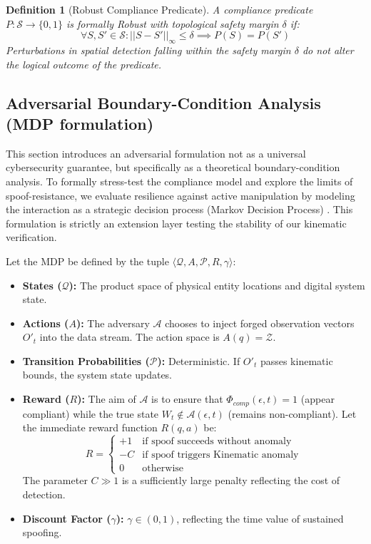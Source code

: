 \documentclass[conference]{IEEEtran}
\newtheorem{definition}{Definition}
\newcommand{\Z}{\mathcal{Z}} %
\newcommand{\Sstate}{\mathcal{S}} %
\newcommand{\Auth}{\mathcal{A}} %
\begin{document}
\begin{definition}[Robust Compliance Predicate]
A compliance predicate $P: \Sstate \to \{0, 1\}$ is formally Robust with topological safety margin $\delta$ if:
\begin{equation}
\forall S, S' \in \Sstate: ||S - S'||_\infty \le \delta \implies P(S) = P(S')
\end{equation}
Perturbations in spatial detection falling within the safety margin $\delta$ do not alter the logical outcome of the predicate.
\end{definition}

\subsection{Adversarial Boundary-Condition Analysis (MDP formulation)}

This section introduces an adversarial formulation not as a universal cybersecurity guarantee, but specifically as a theoretical boundary-condition analysis. To formally stress-test the compliance model and explore the limits of spoof-resistance, we evaluate resilience against active manipulation by modeling the interaction as a strategic decision process (Markov Decision Process) \cite{b10, b21}. This formulation is strictly an extension layer testing the stability of our kinematic verification.

Let the MDP be defined by the tuple $\langle \mathcal{Q}, A, \mathcal{P}, R, \gamma \rangle$:
\begin{itemize}
    \item \textbf{States ($\mathcal{Q}$):} The product space of physical entity locations and digital system state.
    \item \textbf{Actions ($A$):} The adversary $\mathcal{A}$ chooses to inject forged observation vectors $O'_{t}$ into the data stream. The action space is $A(q) = \Z$.
    \item \textbf{Transition Probabilities ($\mathcal{P}$):} Deterministic. If $O'_{t}$ passes kinematic bounds, the system state updates.
    \item \textbf{Reward ($R$):} The aim of $\mathcal{A}$ is to ensure that $\Phi_{comp}(\epsilon, t) = 1$ (appear compliant) while the true state $W_t \notin \Auth(\epsilon, t)$ (remains non-compliant). Let the immediate reward function $R(q, a)$ be:
    \begin{equation}
    R = \begin{cases} 
    +1 & \text{if spoof succeeds without anomaly} \\
    - C & \text{if spoof triggers Kinematic anomaly} \\
    0 & \text{otherwise} 
    \end{cases}
    \end{equation}
    The parameter $C \gg 1$ is a sufficiently large penalty reflecting the cost of detection.
    \item \textbf{Discount Factor ($\gamma$):} $\gamma \in (0, 1)$, reflecting the time value of sustained spoofing.
\end{itemize}
\end{document}
